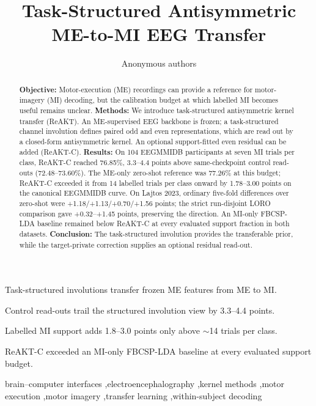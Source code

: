 \documentclass[preprint,12pt]{elsarticle}
\begin{document}
\begin{frontmatter}

\title{Task-Structured Antisymmetric ME-to-MI EEG Transfer}

\author{Anonymous authors}
\address{Affiliation information withheld during anonymous review}

\begin{abstract}
\textbf{Objective:} Motor-execution (ME) recordings can provide a reference for motor-imagery (MI) decoding, but the calibration budget at which labelled MI becomes useful remains unclear. \textbf{Methods:} We introduce task-structured antisymmetric kernel transfer (ReAKT). An ME-supervised EEG backbone is frozen; a task-structured channel involution defines paired odd and even representations, which are read out by a closed-form antisymmetric kernel. An optional support-fitted even residual can be added (ReAKT-C). \textbf{Results:} On 104 EEGMMIDB participants at seven MI trials per class, ReAKT-C reached 76.85\%, 3.3--4.4 points above same-checkpoint control read-outs (72.48--73.60\%). The ME-only zero-shot reference was 77.26\% at this budget; ReAKT-C exceeded it from 14 labelled trials per class onward by 1.78--3.00 points on the canonical EEGMMIDB curve. On Lajtos 2023, ordinary five-fold differences over zero-shot were +1.18/+1.13/+0.70/+1.56 points; the strict run-disjoint LORO comparison gave +0.32--+1.45 points, preserving the direction. An MI-only FBCSP-LDA baseline remained below ReAKT-C at every evaluated support fraction in both datasets. \textbf{Conclusion:} The task-structured involution provides the transferable prior, while the target-private correction supplies an optional residual read-out.
\end{abstract}

\begin{highlights}
\item Task-structured involutions transfer frozen ME features from ME to MI.
\item Control read-outs trail the structured involution view by 3.3--4.4 points.
\item Labelled MI support adds 1.8--3.0 points only above $\sim$14 trials per class.
\item ReAKT-C exceeded an MI-only FBCSP-LDA baseline at every evaluated support budget.
\end{highlights}

\begin{keyword}
brain--computer interfaces \sep electroencephalography \sep kernel methods \sep motor execution \sep motor imagery \sep transfer learning \sep within-subject decoding
\end{keyword}

\end{frontmatter}
\end{document}

